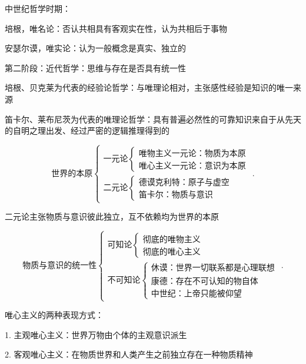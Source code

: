 中世纪哲学时期：
\begin{notation}
    培根，唯名论：否认共相具有客观实在性，认为共相后于事物

    安瑟尔谟，唯实论：认为一般概念是真实、独立的
\end{notation}

第二阶段：近代哲学：思维与存在是否具有统一性
\begin{notation}
    培根、贝克莱为代表的经验论哲学：与唯理论相对，主张感性经验是知识的唯一来源

    笛卡尔、莱布尼茨为代表的唯理论哲学：具有普遍必然性的可靠知识来自于从先天的自明之理出发、经过严密的逻辑推理得到的
\end{notation}
\[
    \text{世界的本原}
    \begin{cases}
        \text{一元论}\begin{cases}
            \text{唯物主义一元论：物质为本原}\\ 
            \text{唯心主义一元论：意识为本原}
        \end{cases}\\ 
        \text{二元论}\begin{cases}
            \text{德谟克利特：原子与虚空}\\ 
            \text{笛卡尔：物质与意识}
        \end{cases}
    \end{cases}
.\] 
\begin{notation}
    二元论主张物质与意识彼此独立，互不依赖均为世界的本原
\end{notation}
\[
    \text{物质与意识的统一性}\begin{cases}
        \text{可知论}\begin{cases}
            \text{彻底的唯物主义}\\ 
            \text{彻底的唯心主义}
        \end{cases}\\ 
        \text{不可知论}\begin{cases}
            \text{休谟：世界一切联系都是心理联想}\\ 
            \text{康德：存在不可认知的物自体}\\ 
            \text{中世纪：上帝只能被仰望} 
        \end{cases}
    \end{cases}
.\] 
\begin{notation}
    唯心主义的两种表现方式：

    1. 主观唯心主义：世界万物由个体的主观意识派生

    2. 客观唯心主义：在物质世界和人类产生之前独立存在一种物质精神
\end{notation}
